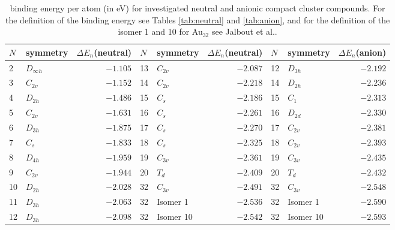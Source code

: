 \begin{table}[ht!]
	\centering
	\caption{binding energy per atom (in eV) for investigated neutral and anionic compact cluster compounds. For the definition of
	the binding energy see Tables \ref{tab:neutral} and \ref{tab:anion}, and for the definition of the isomer 1 and 10 for Au$_{32}$
	see Jalbout et al.\autocite{Jalbout_LowSymmetryStructuresAu_2008}.}
	\begin{tabular}{llr|llr|llr}
		\toprule
		$N$  & symmetry  & $\Delta E_n$(neutral) & $N$  & symmetry  & $\Delta E_n$(neutral) & $N$  & symmetry  & $\Delta E_n$(anion) \\
		\midrule
		  2  & $D_{\infty h}$ & $-1.105$ & 13 & $C_{2v}$   & $-2.087$ & 12 & $D_{3h}$ &  $-2.192$ \\
		3  & $C_{2v}$       & $-1.152$   & 14 & $C_{2v}$ & $-2.218$ & 14 & $D_{2h}$ &  $-2.236$    \\
		  4  & $D_{2h}$       & $-1.486$ & 15 & $C_s$    & $-2.186$ & 15 & $C_1$    &  $-2.313$\\
		  5  & $C_{2v}$       & $-1.631$ & 16 & $C_s$    & $-2.261$ & 16 & $D_{2d}$ &  $-2.330$ \\
		  6  & $D_{3h}$       & $-1.875$ & 17 & $C_s$    & $-2.270$ & 17 & $C_{2v}$ &  $-2.381$ \\
		  7  & $C_s$          & $-1.833$ & 18 & $C_s$    & $-2.325$ & 18 & $C_{2v}$ &  $-2.393$ \\
		  8  & $D_{4h}$       & $-1.959$ & 19 & $C_{3v}$ & $-2.361$ & 19 & $C_{3v}$ &  $-2.435$  \\
		  9  & $C_{2v}$       & $-1.944$ & 20 & $T_d$    & $-2.409$ & 20 & $T_d$    &  $-2.432$ \\
		  10 & $D_{2h}$       & $-2.028$ & 32 & $C_{3v}$ & $-2.491$ & 32 & $C_{3v}$ &  $-2.548$\\
		  11 & $D_{3h}$       & $-2.063$ & 32 & Isomer 1 & $-2.536$ & 32 & Isomer 1 &  $-2.590$  \\
		  12 & $D_{3h}$ 	  & $-2.098$ & 32 & Isomer 10& $-2.542$ & 32 & Isomer 10&  $-2.593$\\
		\bottomrule
	\end{tabular}
	\label{tab:Aun}
\end{table}


